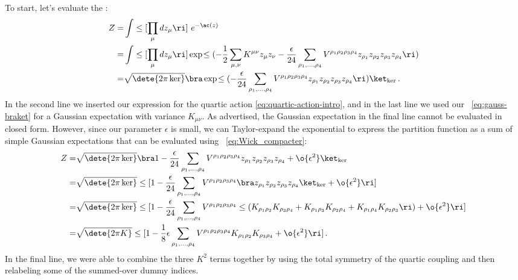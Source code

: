 To start, let's evaluate the :
\begin{align}
Z=& \int \le[\prod_{\mu}d z_{\mu}\ri]\ e^{-\ac(z)}\, \\
=&\int \le[\prod_{\mu}d z_{\mu}\ri] \exp\!\le(-\frac{1}{2}\sum_{\mu,\nu}K^{\mu\nu}z_{\mu}z_{\nu}%
-\frac{\epsilon}{24}\sum_{\rho_1,\ldots,\rho_4}V^{\rho_1\rho_2\rho_3\rho_4}z_{\rho_1}z_{\rho_2}z_{\rho_3}z_{\rho_4}\ri)\, \nonumber\\
=&\sqrt{\dete{2\pi\ker}}\bra\exp\!\le(-\frac{\epsilon}{24}\sum_{\rho_1,\ldots,\rho_4}V^{\rho_1\rho_2\rho_3\rho_4}z_{\rho_1}z_{\rho_2}z_{\rho_3}z_{\rho_4}\ri)\ket_{\ker}\, .\nonumber
\end{align}
In the second line we inserted our expression for the quartic action \eqref{eq:quartic-action-intro}, and in the last line we used our ~\eqref{eq:gauss-braket} for a Gaussian expectation with variance $K_{\mu\nu}$. As advertised, the Gaussian expectation in the final line cannot be evaluated in closed form.
However, since our parameter $\epsilon$ is small, we can Taylor-expand the exponential to express the partition function as a sum of simple Gaussian expectations that can be evaluated using ~\eqref{eq:Wick_compacter}:
\begin{align}\label{eq:first-order-perturbation-theory-partition-function}
Z=&\sqrt{\dete{2\pi\ker}}\bra 1-\frac{\epsilon}{24}\sum_{\rho_1,\ldots,\rho_4}V^{\rho_1\rho_2\rho_3\rho_4}z_{\rho_1}z_{\rho_2}z_{\rho_3}z_{\rho_4}+\o{\epsilon^2}\ket_{\ker}\, \\
=&\sqrt{\dete{2\pi\ker}}\le[1-\frac{\epsilon}{24}\sum_{\rho_1,\ldots,\rho_4}V^{\rho_1\rho_2\rho_3\rho_4}\bra z_{\rho_1}z_{\rho_2}z_{\rho_3}z_{\rho_4}\ket_{\ker}+\o{\epsilon^2}\ri]\, \nonumber\\
=&\sqrt{\dete{2\pi\ker}}\le[1-\frac{\epsilon}{24}\sum_{\rho_1,\ldots,\rho_4}V^{\rho_1\rho_2\rho_3\rho_4}\le(K_{\rho_1\rho_2}K_{\rho_3\rho_4} +K_{\rho_1\rho_3}K_{\rho_2\rho_4}+ K_{\rho_1\rho_4}K_{\rho_2\rho_3} \ri)+\o{\epsilon^2}\ri]\, \nonumber\\
=&\sqrt{\dete{2\pi K}}\le[1-\frac{1}{8}\epsilon  \sum_{\rho_1,\ldots,\rho_4}V^{\rho_1\rho_2\rho_3\rho_4} K_{\rho_1\rho_2}K_{\rho_3\rho_4}+\o{\epsilon^2}\ri]\, .\nonumber
\end{align}
In the final line, we 
 were able to combine the three $K^2$ terms together by using the total symmetry of the quartic coupling and then relabeling some of the summed-over dummy indices.

